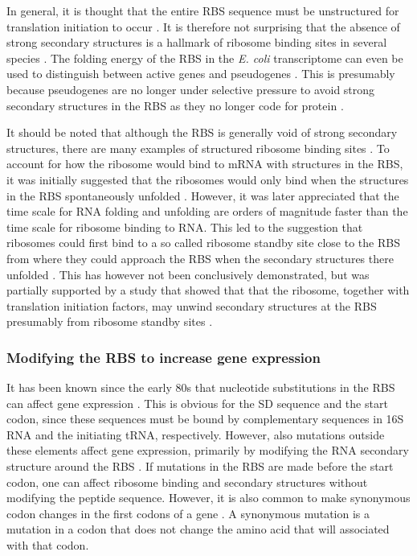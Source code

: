 In general, it is thought that the entire RBS sequence must be unstructured for
translation initiation to occur \cite{seo_quantitative_2009}. It is therefore
not surprising that the absence of strong secondary structures is a hallmark of
ribosome binding sites in several species \cite{gu_universal_2010}. The folding
energy of the RBS in the \textit{E. coli} transcriptome can even be used to
distinguish between active genes and pseudogenes \cite{keller_reduced_2012}.
This is presumably because pseudogenes are no longer under selective pressure
to avoid strong secondary structures in the RBS as they no longer code for
protein \cite{keller_reduced_2012}.

It should be noted that although the RBS is generally void of strong secondary
structures, there are many examples of structured ribosome binding sites
\cite{studer_unfolding_2006}. To account for how the ribosome would bind to
mRNA with structures in the RBS, it was initially suggested that the ribosomes
would only bind when the structures in the RBS spontaneously unfolded
\cite{de_smit_translational_1994}. However, it was later appreciated that the
time scale for RNA folding and unfolding are orders of magnitude faster than
the time scale for ribosome binding to RNA. This led to the suggestion that
ribosomes could first bind to a so called ribosome standby site close to the
RBS from where they could approach the RBS when the secondary structures there
unfolded \cite{de_smit_translational_2003}. This has however not been
conclusively demonstrated, but was partially supported by a study that showed
that that the ribosome, together with translation initiation factors, may
unwind secondary structures at the RBS presumably from ribosome standby sites
\cite{studer_unfolding_2006}.

\subsubsection{Modifying the RBS to increase gene expression}
It has been known since the early 80s that nucleotide substitutions in the RBS
can affect gene expression \cite{warburton_increased_1983}. This is obvious for
the SD sequence and the start codon, since these sequences must be bound by
complementary sequences in 16S RNA and the initiating tRNA, respectively.
However, also mutations outside these elements affect gene expression,
primarily by modifying the RNA secondary structure around the RBS
\cite{park_design_2007, care_translation_2007}. If mutations in the RBS are
made before the start codon, one can affect ribosome binding and secondary
structures without modifying the peptide sequence. However, it is also common
to make synonymous codon changes in the first codons of a gene
\cite{cebe_rapid_2006}. A synonymous mutation is a mutation in a codon that
does not change the amino acid that will associated with that codon.

